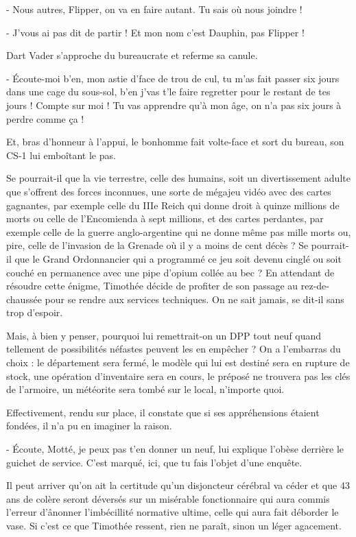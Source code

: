 - Nous autres, Flipper, on va en faire autant. Tu sais où nous joindre !

- J’vous ai pas dit de partir ! Et mon nom c’est Dauphin, pas Flipper !

Dart Vader s’approche du bureaucrate et referme sa canule.

- Écoute-moi b’en, mon astie d’face de trou de cul, tu m’as fait passer six jours dans une cage du sous-sol, b’en j’vas t’le faire regretter pour le restant de tes jours ! Compte sur moi ! Tu vas apprendre qu’à mon âge, on n’a pas six jours à perdre comme ça !

Et, bras d’honneur à l’appui, le bonhomme fait volte-face et sort du bureau, son CS-1 lui emboîtant le pas.

Se pourrait-il que la vie terrestre, celle des humains, soit un divertissement adulte que s’offrent des forces inconnues, une sorte de mégajeu vidéo avec des cartes gagnantes, par exemple celle du IIIe Reich qui donne droit à quinze millions de morts ou celle de l’Encomienda à sept millions, et des cartes perdantes, par exemple celle de la guerre anglo-argentine qui ne donne même pas mille morts ou, pire, celle de l’invasion de la Grenade où il y a moins de cent décès ? Se pourrait-il que le Grand Ordonnancier qui a programmé ce jeu soit devenu cinglé ou soit couché en permanence avec une pipe d’opium collée au bec ? En attendant de résoudre cette énigme, Timothée décide de profiter de son passage au rez-de-chaussée pour se rendre aux services techniques. On ne sait jamais, se dit-il sans trop d’espoir.

Mais, à bien y penser, pourquoi lui remettrait-on un DPP tout neuf quand tellement de possibilités néfastes peuvent les en empêcher ? On a l’embarras du choix : le département sera fermé, le modèle qui lui est destiné sera en rupture de stock, une opération d’inventaire sera en cours, le préposé ne trouvera pas les clés de l’armoire, un météorite sera tombé sur le local, n’importe quoi.

Effectivement, rendu sur place, il constate que si ses appréhensions étaient fondées, il n’a pu en imaginer la raison.

- Écoute, Motté, je peux pas t’en donner un neuf, lui explique l’obèse derrière le guichet de service. C’est marqué, ici, que tu fais l’objet d’une enquête.

Il peut arriver qu’on ait la certitude qu’un disjoncteur cérébral va céder et que 43 ans de colère seront déversés sur un misérable fonctionnaire qui aura commis l’erreur d’ânonner l’imbécillité normative ultime, celle qui aura fait déborder le vase. Si c’est ce que Timothée ressent, rien ne paraît, sinon un léger agacement.

